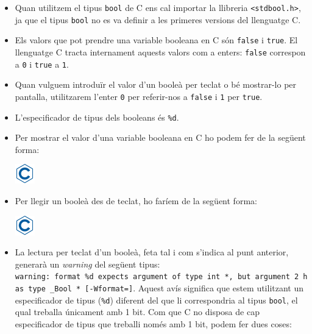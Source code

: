 \documentclass[]{book}
\newenvironment{Shaded}{\begin{snugshade}}{\end{snugshade}}
\newcommand{\SpecialCharTok}[1]{\textcolor[rgb]{0.00,0.00,0.00}{#1}}
\newcommand{\StringTok}[1]{\textcolor[rgb]{0.31,0.60,0.02}{#1}}
\newcommand{\NormalTok}[1]{#1}
\providecommand{\tightlist}{%
  \setlength{\itemsep}{0pt}\setlength{\parskip}{0pt}}
\begin{document}
\begin{itemize}
\tightlist
\item
  Quan utilitzem el tipus \texttt{bool} de C ens cal importar la
  llibreria \texttt{\textless{}stdbool.h\textgreater{}}, ja que el tipus
  \texttt{bool} no es va definir a les primeres versions del llenguatge
  C.
\item
  Els valors que pot prendre una variable booleana en C són
  \texttt{false} i \texttt{true}. El llenguatge C tracta internament
  aquests valors com a enters: \texttt{false} correspon a \texttt{0} i
  \texttt{true} a \texttt{1}.
\item
  Quan vulguem introduïr el valor d'un booleà per teclat o bé mostrar-lo
  per pantalla, utilitzarem l'enter \texttt{0} per referir-nos a
  \texttt{false} i \texttt{1} per \texttt{true}.
\item
  L'especificador de tipus dels booleans és \texttt{\%d}.
\item
  Per mostrar el valor d'una variable booleana en C ho podem fer de la
  següent forma:

  \includegraphics{./img/c.png}

\begin{Shaded}
\end{Shaded}
\item
  Per llegir un booleà des de teclat, ho faríem de la següent forma:

  \includegraphics{./img/c.png}

\begin{Shaded}
\end{Shaded}
\item
  La lectura per teclat d'un booleà, feta tal i com s'indica al punt
  anterior, generarà un \emph{warning} del següent tipus:
  \texttt{warning:\ format\ \textquotesingle{}\%d\textquotesingle{}\ expects\ argument\ of\ type\ \textquotesingle{}int\ *\textquotesingle{},\ but\ argument\ 2\ has\ type\ \textquotesingle{}\_Bool\ *\textquotesingle{}\ {[}-Wformat={]}}.
  Aquest avís significa que estem utilitzant un especificador de tipus
  (\texttt{\%d}) diferent del que li correspondria al tipus
  \texttt{bool}, el qual treballa únicament amb 1 bit. Com que C no
  disposa de cap especificador de tipus que treballi només amb 1 bit,
  podem fer dues coses:


\end{itemize}
\end{document}
